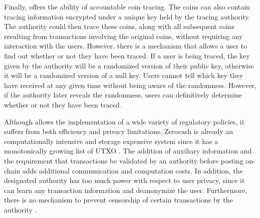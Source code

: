 Finally, \cite{GGM16} offers the ability of accountable coin tracing. The coins can also contain tracing information encrypted under a unique key held by the tracing authority. The authority could then trace these coins, along with all subsequent coins resulting from transactions involving the original coins, without requiring any interaction with the users. However, there is a mechanism that allows a user to find out whether or not they have been traced. If a user is being traced, the key given by the authority will be a randomized version of their public key, otherwise it will be a randomized version of a null key. Users cannot tell which key they have received at any given time without being aware of the randomness. However, if the authority later reveals the randomness, users can definitively determine whether or not they have been traced. 

Although \cite{GGM16} allows the implementation of a wide variety of regulatory policies, it suffers from both efficiency and privacy limitations. Zerocash is already an computationally intensive and storage expensive system since it has a monotonically growing list of UTXO \cite{SoKPrivacyPreservingComputing}.  The addition of auxiliary information and the requirement that transactions be validated by an authority before posting on-chain adds additional communication and computation costs. In addition, the designated authority has too much power with respect to user privacy, since it can learn any transaction information and deanonymize the user. Furthermore, there is no mechanism to prevent censorship of certain transactions by the authority \cite{SokAuditability}.